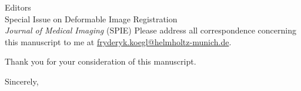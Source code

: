 \documentclass[11pt,a4paper]{letter}
\begin{document}
\begin{letter}{Editors\\
Special Issue on Deformable Image Registration\\
\textit{Journal of Medical Imaging} (SPIE)}
Please address all correspondence concerning this manuscript to me at \href{mailto:fryderyk.koegl@helmholtz-munich.de}{fryderyk.koegl@helmholtz-munich.de}.

Thank you for your consideration of this manuscript.

\closing{Sincerely,}

\end{letter}
\end{document}
